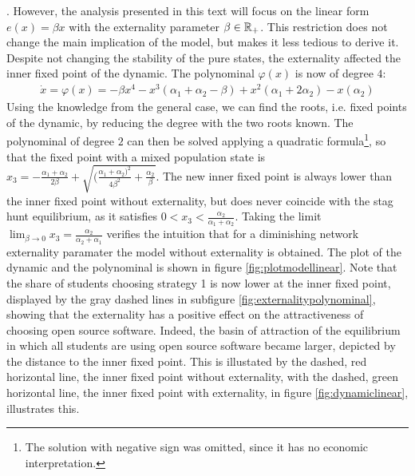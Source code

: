 \parencite[73]{lin_impact_2008}. However, the analysis presented in this text
will focus on the linear form $e(x) = \beta x$ with the externality parameter
$\beta \in \mathbb{R}_+$. This restriction does not change the main implication
of the model, but makes it less tedious to derive it.
Despite not changing the stability of the pure states, 
the externality affected the inner fixed point of the dynamic.
The polynominal $\varphi(x)$ is now of degree $4$:
\begin{align}
        \dot{x} = \varphi(x) = -\beta x^4 -x^3(\alpha_1 + \alpha_2 
        - \beta ) + x^2 (\alpha_1 + 2 \alpha_2) - x(\alpha_2)
\end{align}
Using the knowledge from the general case, we can find the roots, i.e. fixed
points of the dynamic, by reducing the degree with the two roots known. The
polynominal of degree $2$ can then be solved applying a quadratic formula\footnote{
The solution with negative sign was omitted, since it has no economic 
interpretation.}, so that the fixed point with a mixed population state is
$x_3 = -\frac{\alpha_1+\alpha_2}{2 \beta} + 
\sqrt{(\frac{\alpha_1+\alpha_2)^2}{4\beta^2} +\frac{\alpha_2}{\beta}}$. 
The new inner fixed point is always lower than the inner fixed point without 
externality, but does never coincide with the stag hunt equilibrium, as it 
satisfies $0<x_3<\frac{\alpha_2}{\alpha_1+\alpha_2}$. 
Taking the limit $\lim_{\beta \rightarrow 0} x_3 = 
\frac{\alpha_2}{\alpha_2+\alpha_1}$ verifies the intuition that for a 
diminishing network externality paramater the model without 
externality is obtained.
The plot of the dynamic and the polynominal is 
shown in figure \ref{fig:plotmodellinear}.
Note that the share of students choosing strategy 1 is now lower at the 
inner fixed point, displayed by the gray dashed lines in subfigure 
\ref{fig:externalitypolynominal}, showing that the externality has a positive 
effect on the attractiveness of choosing open source software. 
Indeed, the basin of attraction of the equilibrium in which all 
students are using open source software became larger, 
depicted by the distance to the inner fixed point.
This is illustated by the dashed, red horizontal line, 
the inner fixed point without externality, with the dashed, green horizontal 
line, the inner fixed point with externality, 
in figure \ref{fig:dynamiclinear}, illustrates this. 
